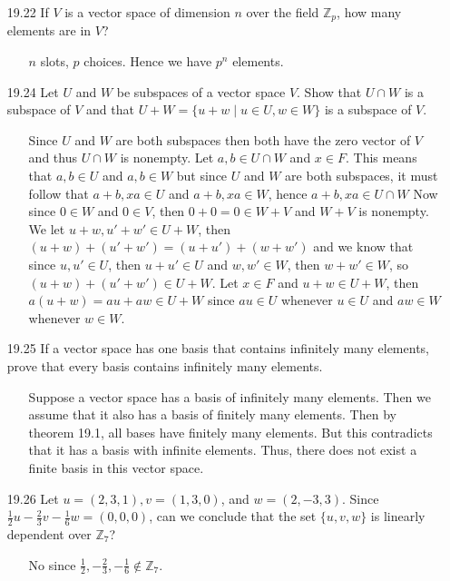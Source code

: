 \documentclass[12pt]{article}
\begin{document}
\begin{enumerate}
\item[19.22] If $V$ is a vector space of dimension $n$ over the field $\mathbb{Z}_p$, how many elements are in $V$?
\begin{enumerate}
\item[] $n$ slots, $p$ choices. Hence we have $p^n$ elements.
\end{enumerate}

\item[19.24] Let $U$ and $W$ be subspaces of a vector space $V$. Show that $U \cap W$ is a subspace of $V$ and that $U + W = \{ u + w \mid u \in U, w \in W \}$ is a subspace of $V$.
\begin{enumerate}
\item[] Since $U$ and $W$ are both subspaces then both have the zero vector of $V$ and thus $U \cap W$ is nonempty. Let $a, b \in U \cap W$ and $x \in F$. This means that $a, b \in U$ and $a, b \in W$ but since $U$ and $W$ are both subspaces, it must follow that $a+b, xa \in U$ and $a+b, xa \in W$, hence $a+b, xa \in U \cap W$ Now since $0 \in W$ and $0 \in V$, then $0 + 0 = 0 \in W+V$ and $W+V$ is nonempty. We let $u + w, u' + w' \in U + W$, then $(u + w) + (u' + w') = (u + u') + (w + w')$ and we know that since $u, u' \in U$, then $u + u' \in U$ and $w, w' \in W$, then $w+ w' \in W$, so $(u + w) + (u' + w') \in U + W$. Let $x \in F$ and $u + w \in U + W$, then $a(u + w) = au + aw \in U + W$ since $au \in U$ whenever $u \in U$ and $aw \in W$ whenever $w \in W$.
\end{enumerate}

\item[19.25] If a vector space has one basis that contains infinitely many elements, prove that every basis contains infinitely many elements.
\begin{enumerate}
\item[] Suppose a vector space has a basis of infinitely many elements. Then we assume that it also has a basis of finitely many elements. Then by theorem 19.1, all bases have finitely many elements. But this contradicts that it has a basis with infinite elements. Thus, there does not exist a finite basis in this vector space.
\end{enumerate}

\item[19.26] Let $u = (2,3,1), v = (1,3,0)$, and $w = (2, -3, 3)$. Since $\frac{1}{2}u - \frac{2}{3}v - \frac{1}{6}w = (0,0,0)$, can we conclude that the set $\{ u, v, w\}$ is linearly dependent over $\mathbb{Z}_7$?
\begin{enumerate}
\item[] No since $\frac{1}{2}, -\frac{2}{3}, -\frac{1}{6} \not\in \mathbb{Z}_7$.
\end{enumerate}


\end{enumerate}
\end{document}
